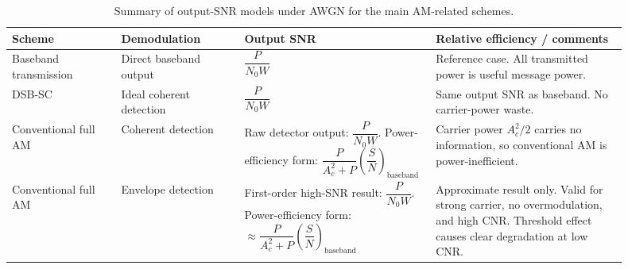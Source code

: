 \begin{table}[H]
\centering
\small
\renewcommand{\arraystretch}{1.2}
\begin{tabular}{|>{\raggedright\arraybackslash}p{0.16\linewidth}|>{\raggedright\arraybackslash}p{0.18\linewidth}|>{\raggedright\arraybackslash}p{0.28\linewidth}|>{\raggedright\arraybackslash}p{0.28\linewidth}|}
\hline
\textbf{Scheme} & \textbf{Demodulation} & \textbf{Output SNR} & \textbf{Relative efficiency / comments} \\
\hline
Baseband transmission & Direct baseband output & $\dfrac{P}{N_0 W}$ & Reference case. All transmitted power is useful message power. \\
\hline
DSB-SC & Ideal coherent detection & $\dfrac{P}{N_0 W}$ & Same output SNR as baseband. No carrier-power waste. \\
\hline
Conventional full AM & Coherent detection & Raw detector output: $\dfrac{P}{N_0 W}$. \newline Power-efficiency form: $\dfrac{P}{A_c^2+P}\left(\dfrac{S}{N}\right)_{\mathrm{baseband}}$ & Carrier power $A_c^2/2$ carries no information, so conventional AM is power-inefficient. \\
\hline
Conventional full AM & Envelope detection & First-order high-SNR result: $\dfrac{P}{N_0 W}$. \newline Power-efficiency form: $\approx \dfrac{P}{A_c^2+P}\left(\dfrac{S}{N}\right)_{\mathrm{baseband}}$ & Approximate result only. Valid for strong carrier, no overmodulation, and high CNR. Threshold effect causes clear degradation at low CNR. \\
\hline
\end{tabular}
\caption{Summary of output-SNR models under AWGN for the main AM-related schemes.}
\label{tab:lab2_awgn_snr_summary}
\end{table}
